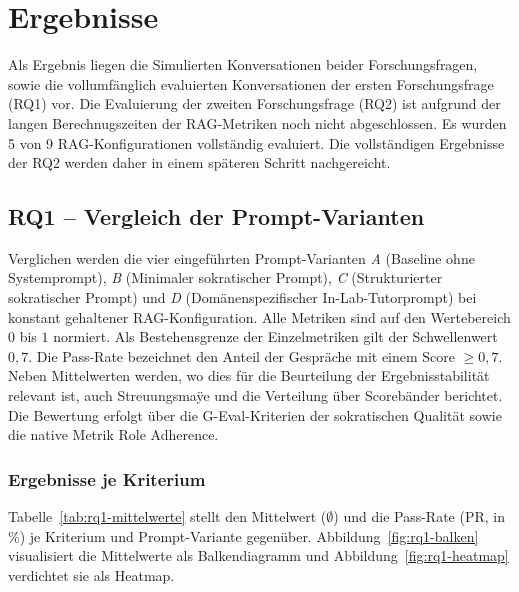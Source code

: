 \section{Ergebnisse}
\label{sec:Ergebnisse}
Als Ergebnis liegen die Simulierten Konversationen beider Forschungsfragen, sowie die vollumfänglich evaluierten Konversationen der ersten Forschungsfrage (RQ1) vor. Die Evaluierung der zweiten Forschungsfrage (RQ2) ist aufgrund der langen Berechnugszeiten der RAG-Metriken noch nicht abgeschlossen. Es wurden 5 von 9 RAG-Konfigurationen vollständig evaluiert. Die vollständigen Ergebnisse der RQ2 werden daher in einem späteren Schritt nachgereicht.
\subsection{RQ1 -- Vergleich der Prompt-Varianten}
\label{subsec:rq1}

Verglichen werden die vier eingeführten Prompt-Varianten \emph{A} (Baseline ohne Systemprompt), \emph{B} (Minimaler sokratischer
Prompt), \emph{C} (Strukturierter sokratischer
Prompt) und \emph{D} (Domänenspezifischer In-Lab-Tutorprompt)  bei konstant gehaltener RAG-Konfiguration. Alle Metriken sind auf den Wertebereich $0$ bis $1$ normiert. Als
Bestehensgrenze der Einzelmetriken gilt der Schwellenwert $0,7$.
Die Pass-Rate bezeichnet
den Anteil der Gespräche mit einem Score $\ge 0{,}7$.
Neben Mittelwerten werden, wo dies für die Beurteilung der Ergebnisstabilität relevant
ist, auch Streuungsmaÿe und die Verteilung über Scorebänder berichtet. Die Bewertung erfolgt über die G-Eval-Kriterien der sokratischen Qualität sowie die native Metrik Role Adherence.

\subsubsection{Ergebnisse je Kriterium}

Tabelle~\ref{tab:rq1-mittelwerte} stellt den Mittelwert ($\emptyset$) und die Pass-Rate (PR, in \%)
je Kriterium und Prompt-Variante gegenüber. Abbildung~\ref{fig:rq1-balken} visualisiert die
Mittelwerte als Balkendiagramm und Abbildung~\ref{fig:rq1-heatmap} verdichtet sie als Heatmap.

